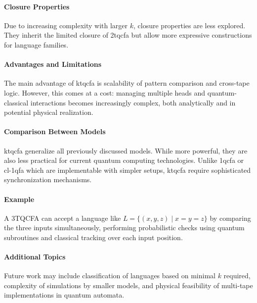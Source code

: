 \paragraph{Closure Properties}  
Due to increasing complexity with larger $k$, closure properties are less explored. They inherit the limited closure of \gls{2tqcfa} but allow more expressive constructions for language families.

\paragraph{Advantages and Limitations}  
The main advantage of \gls{ktqcfa} is scalability of pattern comparison and cross-tape logic. However, this comes at a cost: managing multiple heads and quantum-classical interactions becomes increasingly complex, both analytically and in potential physical realization.

\paragraph{Comparison Between Models}  
\gls{ktqcfa} generalize all previously discussed models. While more powerful, they are also less practical for current quantum computing technologies. Unlike \gls{1qcfa} or \gls{cl-1qfa} which are implementable with simpler setups, \gls{ktqcfa} require sophisticated synchronization mechanisms.

\paragraph{Example}  
A 3TQCFA can accept a language like $L = \{ (x, y, z) \mid x = y = z \}$ by comparing the three inputs simultaneously, performing probabilistic checks using quantum subroutines and classical tracking over each input position.

\paragraph{Additional Topics}  
Future work may include classification of languages based on minimal $k$ required, complexity of simulations by smaller models, and physical feasibility of multi-tape implementations in quantum automata.